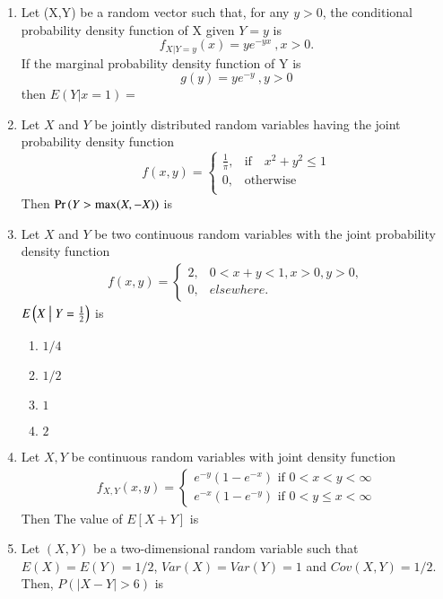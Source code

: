 \begin{enumerate}[label=\thesection.\arabic*.,ref=\thesection.\theenumi]
\item Let (X,Y) be a random vector such that, for any $y>0$, the conditional probability density function of X given $Y=y$ is $$f_{X|Y=y}(x)=ye^{-yx} \:,x>0. $$ If the marginal probability density function of Y is $$g(y)=ye^{-y}\:,y>0$$ then $E(Y|x=1)=$
\\
\solution

%
%
\item Let $X$ and $Y$ be jointly distributed random
variables having the joint probability
density function
\[
f(x,y) = \begin{cases}
            \frac{1}{\pi}, &\text{if}\quad x^2 + y^2 \leq 1\\
             0, &\text{otherwise}\\
            \end{cases}
\]
Then $\Pr\left(Y > \text{max}(X,-X)\right)$ is
\\
\solution 

%
\item Let $X$ and $Y$ be two continuous random variables with the joint probability density function
\begin{align}
    f(x,y) =
    \begin{cases}
    2, & 0<x+y<1, x>0, y>0,\\
    0, & elsewhere.
    \end{cases}
\end{align}
$E\left(X \bigm| Y=\frac{1}{2}\right)$ is
\begin{enumerate}
    \item $1/4$
    \item $1/2$
    \item $1$
    \item $2$
\end{enumerate}
\solution
%
%
\item Let $X ,Y$ be continuous random variables with joint density function
\begin{align*}
    f_{X,Y}(x,y)=\begin{cases}
    e^{-y}(1-e^{-x}) \text{   if } 0< x<y<\infty\\
    e^{-x}(1-e^{-y}) \text{   if } 0< y\leq x<\infty
    \end{cases}
\end{align*}
Then The value of $E[X+Y]$ is 
%
\solution
  
%
\item Let $(X,Y)$ be a two-dimensional random variable such that $E(X)=E(Y)=1/2$, $Var(X)=Var(Y)=1$ and $Cov(X,Y)=1/2$.
Then, $P(|X-Y|>6)$ is
\begin{enumerate}


\end{enumerate}
\end{enumerate}
